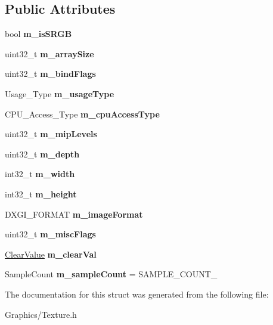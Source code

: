 \subsection*{Public Attributes}
\begin{DoxyCompactItemize}
\item 
\mbox{\label{structTextureDesc_ad3b033f8ba997275a18e4615b07b0be3}} 
bool {\bfseries m\+\_\+is\+S\+R\+GB}
\item 
\mbox{\label{structTextureDesc_a45bea3f39a882938a6c26d30c2ab56ef}} 
uint32\+\_\+t {\bfseries m\+\_\+array\+Size}
\item 
\mbox{\label{structTextureDesc_a8b3e93ac609f4d4d48b8be49ea0674b1}} 
uint32\+\_\+t {\bfseries m\+\_\+bind\+Flags}
\item 
\mbox{\label{structTextureDesc_ace578159a9f8c34690cf04097583c502}} 
Usage\+\_\+\+Type {\bfseries m\+\_\+usage\+Type}
\item 
\mbox{\label{structTextureDesc_af97ec59197c3ee197c825e2201790d1b}} 
C\+P\+U\+\_\+\+Access\+\_\+\+Type {\bfseries m\+\_\+cpu\+Access\+Type}
\item 
\mbox{\label{structTextureDesc_a6789cd7412cd58bdf83d5cd17bc0e6cd}} 
uint32\+\_\+t {\bfseries m\+\_\+mip\+Levels}
\item 
\mbox{\label{structTextureDesc_a43cbf311c7127add644b4518a38967b0}} 
uint32\+\_\+t {\bfseries m\+\_\+depth}
\item 
\mbox{\label{structTextureDesc_aed33bb186b216d3e2b905a84ef70fc9f}} 
int32\+\_\+t {\bfseries m\+\_\+width}
\item 
\mbox{\label{structTextureDesc_a93e1d64c987271f0324a64b3fdeda7cd}} 
int32\+\_\+t {\bfseries m\+\_\+height}
\item 
\mbox{\label{structTextureDesc_a2bc56886b15b067e111f5ae23caa9a24}} 
D\+X\+G\+I\+\_\+\+F\+O\+R\+M\+AT {\bfseries m\+\_\+image\+Format}
\item 
\mbox{\label{structTextureDesc_a97bc6385264a61bedd67a85375ac068b}} 
uint32\+\_\+t {\bfseries m\+\_\+misc\+Flags}
\item 
\mbox{\label{structTextureDesc_afe861ab0e07ec763ef32e2ef2ab521e2}} 
\hyperlink{structClearValue}{Clear\+Value} {\bfseries m\+\_\+clear\+Val}
\item 
\mbox{\label{structTextureDesc_a4c680eedbd74133e6d0ff36cb2be9854}} 
Sample\+Count {\bfseries m\+\_\+sample\+Count} = S\+A\+M\+P\+L\+E\+\_\+\+C\+O\+U\+N\+T\+\_
\end{DoxyCompactItemize}


The documentation for this struct was generated from the following file\+:\begin{DoxyCompactItemize}
\item 
Graphics/Texture.\+h\end{DoxyCompactItemize}
